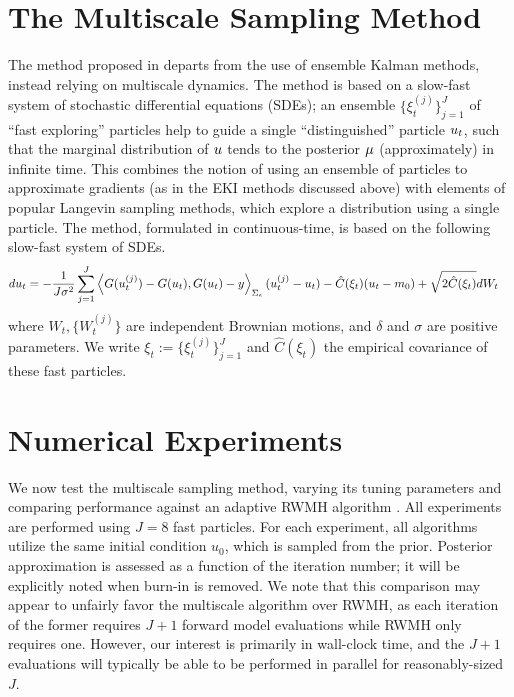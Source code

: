 \documentclass[12pt]{article}
\begin{document}
\section{The Multiscale Sampling Method}
The method proposed in \cite{Pavliotis} departs from the use of ensemble Kalman methods, instead relying on multiscale dynamics. The method is based on a slow-fast system 
of stochastic differential equations (SDEs); an ensemble $\{\xi_t^{(j)}\}_{j=1}^{J}$ of ``fast exploring'' particles help to guide a single ``distinguished'' particle $u_t$, such that the marginal 
distribution of $u$ tends to the posterior $\mu$ (approximately) in infinite time. This combines the notion of using an ensemble of particles to approximate gradients (as in the 
EKI methods discussed above) with elements of popular Langevin sampling methods, which explore a distribution using a single particle. The method, formulated in continuous-time, is 
based on the following slow-fast system of SDEs. 
\begin{align}
du_t &= -\frac{1}{J\sigma^2} \sum_{j=1}^{J} \left\langle G(u_t^{(j)})-G(u_t), G(u_t)-y \right\rangle_{\Sigma_{\epsilon}}(u_t^{(j)}-u_t) - \hat{C}(\xi_t)(u_t - m_0) + \sqrt{2\hat{C}(\xi_t)} dW_t
\end{align}
where $W_t, \{W_t^{(j)}\}$ are independent Brownian motions, and $\delta$ and $\sigma$ are positive parameters. We write $\xi_t := \{\xi_t^{(j)}\}_{j=1}^{J}$ and $\hat{C}(\xi_t)$ the empirical covariance 
of these fast particles. 

\section{Numerical Experiments}
We now test the multiscale sampling method, varying its tuning parameters and comparing performance against an adaptive RWMH algorithm \cite{Haario}. All experiments 
are performed using $J=8$ fast particles. For each experiment, all algorithms utilize the same initial condition $u_0$, which is sampled from the prior. 
Posterior approximation is assessed as a function of the iteration number; it will be explicitly noted when burn-in is removed. We note that this comparison may appear to 
unfairly favor the multiscale algorithm over RWMH, as each iteration of the former requires $J+1$ forward model evaluations while RWMH only requires one. However, our 
interest is primarily in wall-clock time, and the $J+1$ evaluations will typically be able to be performed in parallel for reasonably-sized $J$. 
\end{document}
